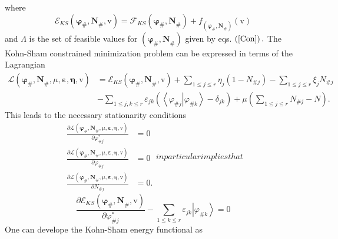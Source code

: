 \documentclass[aps,preprint]{revtex4}%
\begin{document}
where
\begin{equation}
\mathcal{E}_{KS}\left(  \mathbf{\varphi}_{\#}\mathbf{,N}_{\#}\mathbf{,}%
\mathrm{v}\right)  =\mathcal{F}_{KS}\left(  \mathbf{\varphi}_{\#}%
\mathbf{,N}_{\#}\right)  +f_{\left(  \mathbf{\varphi}_{\#}\mathbf{,N}%
_{\#}\right)  }\left(  \mathrm{v}\right)
\end{equation}
and $\mathcal{\Lambda}$ is the set of feasible values for $\left(
\mathbf{\varphi}_{\#}\mathbf{,N}_{\#}\right)  $ given by eqs. $\left(
\ref{Con}\right)  .$ The Kohn-Sham constrained minimization problem can be
expressed in terms of the Lagrangian
\begin{align}
\mathcal{L}\left(  \mathbf{\varphi}_{\#}\mathbf{,N}_{\#},\mu
,\mathbf{\varepsilon,\eta,}\mathrm{v}\right)   &  =\mathcal{E}_{KS}\left(
\mathbf{\varphi}_{\#}\mathbf{,N}_{\#}\mathbf{,}\mathrm{v}\right)  +\sum_{1\leq
j\leq r}\eta_{j}\left(  1-N_{\#j}\right)  -\sum_{1\leq j\leq r}\xi_{j}%
N_{\#j}\\
&  -\sum_{1\leq j,k\leq r}\varepsilon_{jk}\left(  \left\langle \left.
\varphi_{\#j}\right\vert \varphi_{\#k}\right\rangle -\delta_{jk}\right)
+\mu\left(  \sum_{1\leq j\leq r}N_{\#j}-N\right)  .
\end{align}
This leads to the necessary stationarity conditions
\begin{subequations}
\begin{align}
\frac{\partial\mathcal{L}\left(  \mathbf{\varphi}_{\#}\mathbf{,N}_{\#}%
,\mu,\mathbf{\varepsilon,\eta,}\mathrm{v}\right)  }{\partial\varphi
_{\#j}^{\ast}}  &  =0\\
\frac{\partial\mathcal{L}\left(  \mathbf{\varphi}_{\#}\mathbf{,N}_{\#}%
,\mu,\mathbf{\varepsilon,\eta,}\mathrm{v}\right)  }{\partial\varphi_{\#j}}  &
=0\\
\frac{\partial\mathcal{L}\left(  \mathbf{\varphi}_{\#}\mathbf{,N}_{\#}%
,\mu,\mathbf{\varepsilon,\eta,}\mathrm{v}\right)  }{\partial N_{\#j}}  &  =0.
\end{align}
in particular implies that
\end{subequations}
\begin{equation}
\frac{\partial\mathcal{E}_{KS}\left(  \mathbf{\varphi}_{\#}\mathbf{,N}%
_{\#}\mathbf{,}\mathrm{v}\right)  }{\partial\varphi_{\#j}^{\ast}}-\sum_{1\leq
k\leq r}\varepsilon_{jk}\left\vert \varphi_{\#k}\right\rangle =0
\end{equation}
One can develope the Kohn-Sham energy functional as%
\end{document}
